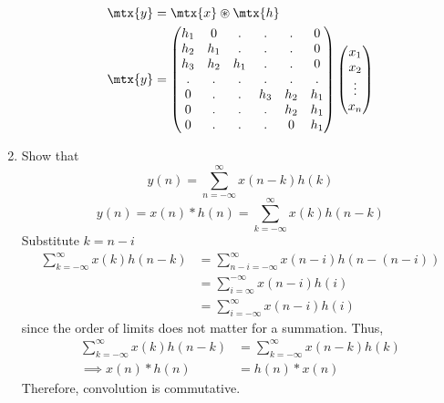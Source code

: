 \documentclass[journal,12pt,twocolumn]{IEEEtran}
\renewcommand\thesection{\arabic{section}}
\begin{document}
\begin{enumerate}[label=\thesection.\arabic*]
\begin{align}
	\mtx{y} &= \mtx{x} \circledast \mtx{h}\\
	\mtx{y} &= 
	\begin{pmatrix}
		h_1 & 0 & . & . & . & 0 \\
		h_2 & h_1 & . & . & . & 0 \\
		h_3 & h_2 & h_1 & . & . & 0 \\
		. & . & . & . & . & . \\
		0 & . & . & h_3 & h_2 & h_1 \\
		0 & . & . & . & h_2 & h_1 \\
		0 & . & . & . & 0 & h_1
	\end{pmatrix}
	\begin{pmatrix}
		x_1 \\ x_2 \\ \vdots \\ x_n
	\end{pmatrix}
\end{align}
	\item Show that
	\begin{equation}
		y(n) =  \sum_{n=-\infty}^{\infty}x(n-k)h(k)
	\end{equation}
\begin{equation}
	y(n) = x(n)*h(n) = \sum_{k=-\infty}^{\infty}x(k)h(n-k)
\end{equation}
\solution
Substitute $k = n - i$
\begin{align}
	\sum_{k=-\infty}^{\infty}x(k)h(n-k) &=  \sum_{n - i =-\infty}^{\infty}x(n-i)h(n-(n-i)) \\
	&= \sum_{i = \infty}^{-\infty} x(n - i) h(i) \\
	&= \sum_{i = -\infty}^{\infty} x(n - i) h(i)
\end{align}
since the order of limits does not matter for a summation.
Thus,
\begin{align}
	\sum_{k=-\infty}^{\infty}x(k)h(n-k) &= \sum_{k=-\infty}^{\infty}x(n-k)h(k) \\
	\implies x(n) * h(n) &= h(n) * x(n)
\end{align}
Therefore, convolution is commutative.
\end{enumerate}
%
\end{document}
